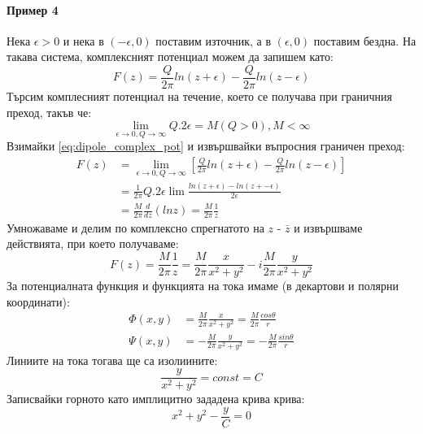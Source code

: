 \paragraph{Пример 4} Нека $\epsilon>0$ и нека в $(-\epsilon,0)$ поставим източник, а в $(\epsilon,0)$ поставим бездна. На такава система, комплексният потенциал можем да запишем като:
\begin{equation}
	\label{eq:dipole_complex_pot}
	F(z) = \frac{Q}{2 \pi} ln (z+\epsilon) - \frac{Q}{2 \pi} ln (z-\epsilon)
\end{equation}
Търсим комплесният потенциал на течение, което се получава при граничния преход, такъв че:
\begin{equation}
	\lim_{\epsilon \to 0, Q \to \infty } Q . 2 \epsilon = M (Q>0), M < \infty
\end{equation}
Взимайки \autoref{eq:dipole_complex_pot} и извършвайки въпросния граничен преход:
\begin{align*}
	F(z) & = \lim_{\epsilon \to 0, Q \to \infty } \left[ \frac{Q}{2 \pi} ln (z+\epsilon) - \frac{Q}{2 \pi} ln (z-\epsilon) \right] \\
	     & = \frac{1}{2\pi} Q.2\epsilon \lim \frac{ln(z+\epsilon)-ln(z+-\epsilon)}{2\epsilon}                                      \\
	     & = \frac{M}{2 \pi} \frac{d}{dz} (ln z) = \frac{M}{2 \pi} \frac{1}{z}
\end{align*}
Умножаваме и делим по комплексно спрегнатото на $z$  - $\bar{z}$ и извършваме действията, при което получаваме:
\begin{equation}
	F(z) = \frac{M}{2 \pi} \frac{1}{z} = \frac{M}{2 \pi} \frac{x}{x^2 + y^2} - i \frac{M}{2 \pi} \frac{y}{x^2 + y^2}
\end{equation}
За потенциалната функция и функцията на тока имаме (в декартови и полярни координати):
\begin{align*}
	\Phi(x,y) & =  \frac{M}{2 \pi} \frac{x}{x^2 + y^2} = \frac{M}{2 \pi} \frac{cos \theta}{r}    \\
	\Psi(x,y) & =  -\frac{M}{2 \pi} \frac{y}{x^2 + y^2} = - \frac{M}{2 \pi} \frac{sin \theta}{r}
\end{align*}
Линиите на тока тогава ще са изолиините: 
\begin{equation*}
    \frac{y}{x^2+y^2} = const = C
\end{equation*}
Записвайки горното като имплицитно зададена крива крива:
\begin{equation*}
    x^2 + y^2 - \frac{y}{C} = 0
\end{equation*}
